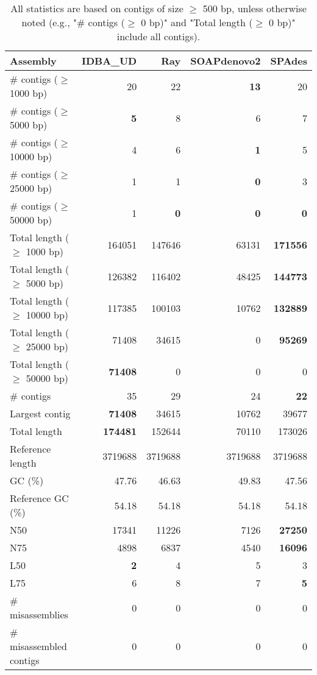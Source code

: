 \documentclass[12pt,a4paper]{article}
\begin{document}
\begin{table}[ht]
\begin{center}
\caption{All statistics are based on contigs of size $\geq$ 500 bp, unless otherwise noted (e.g., "\# contigs ($\geq$ 0 bp)" and "Total length ($\geq$ 0 bp)" include all contigs).}
\begin{tabular}{|l*{4}{|r}|}
\hline
Assembly & IDBA\_UD & Ray & SOAPdenovo2 & SPAdes \\ \hline
\# contigs ($\geq$ 1000 bp) & 20 & 22 & {\bf 13} & 20 \\ \hline
\# contigs ($\geq$ 5000 bp) & {\bf 5} & 8 & 6 & 7 \\ \hline
\# contigs ($\geq$ 10000 bp) & 4 & 6 & {\bf 1} & 5 \\ \hline
\# contigs ($\geq$ 25000 bp) & 1 & 1 & {\bf 0} & 3 \\ \hline
\# contigs ($\geq$ 50000 bp) & 1 & {\bf 0} & {\bf 0} & {\bf 0} \\ \hline
Total length ($\geq$ 1000 bp) & 164051 & 147646 & 63131 & {\bf 171556} \\ \hline
Total length ($\geq$ 5000 bp) & 126382 & 116402 & 48425 & {\bf 144773} \\ \hline
Total length ($\geq$ 10000 bp) & 117385 & 100103 & 10762 & {\bf 132889} \\ \hline
Total length ($\geq$ 25000 bp) & 71408 & 34615 & 0 & {\bf 95269} \\ \hline
Total length ($\geq$ 50000 bp) & {\bf 71408} & 0 & 0 & 0 \\ \hline
\# contigs & 35 & 29 & 24 & {\bf 22} \\ \hline
Largest contig & {\bf 71408} & 34615 & 10762 & 39677 \\ \hline
Total length & {\bf 174481} & 152644 & 70110 & 173026 \\ \hline
Reference length & 3719688 & 3719688 & 3719688 & 3719688 \\ \hline
GC (\%) & 47.76 & 46.63 & 49.83 & 47.56 \\ \hline
Reference GC (\%) & 54.18 & 54.18 & 54.18 & 54.18 \\ \hline
N50 & 17341 & 11226 & 7126 & {\bf 27250} \\ \hline
N75 & 4898 & 6837 & 4540 & {\bf 16096} \\ \hline
L50 & {\bf 2} & 4 & 5 & 3 \\ \hline
L75 & 6 & 8 & 7 & {\bf 5} \\ \hline
\# misassemblies & 0 & 0 & 0 & 0 \\ \hline
\# misassembled contigs & 0 & 0 & 0 & 0 \\ \hline

\end{tabular}
\end{center}
\end{table}
\end{document}
